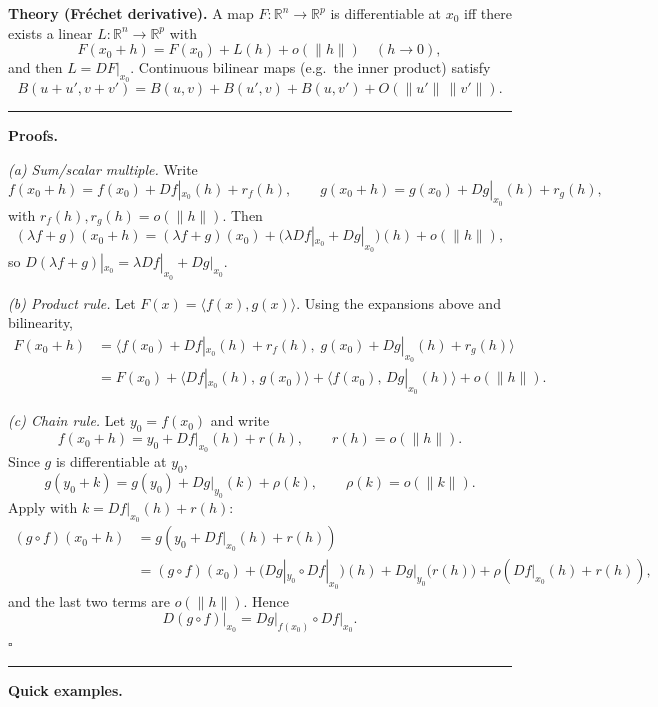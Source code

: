 \documentclass[12pt,a4paper]{article}
\theoremstyle{plain}
\theoremstyle{definition}
\theoremstyle{remark}
\theoremstyle{remark}
\newcommand{\sep}{\vspace{6pt}\hrule\vspace{8pt}}
\begin{document}
\textbf{Theory (Fréchet derivative).}
A map \(F:\mathbb{R}^n\to\mathbb{R}^p\) is differentiable at \(x_0\) iff there exists a
linear \(L:\mathbb{R}^n\to\mathbb{R}^p\) with
\[
F(x_0+h) = F(x_0) + L(h) + o(\|h\|) \quad (h\to 0),
\]
and then \(L = DF|_{x_0}\).
Continuous bilinear maps (e.g.\ the inner product) satisfy
\[
B(u+u',v+v') = B(u,v)+B(u',v)+B(u,v')+O(\|u'\|\,\|v'\|).
\]

\sep

\textbf{Proofs.}

\textit{(a) Sum/scalar multiple.}
Write
\[
f(x_0+h)=f(x_0)+Df|_{x_0}(h)+r_f(h),\qquad
g(x_0+h)=g(x_0)+Dg|_{x_0}(h)+r_g(h),
\]
with \(r_f(h),r_g(h)=o(\|h\|)\).
Then
\[
(\lambda f+g)(x_0+h)
= (\lambda f+g)(x_0)
+ \big(\lambda Df|_{x_0}+Dg|_{x_0}\big)(h)
+ o(\|h\|),
\]
so \(D(\lambda f+g)|_{x_0}=\lambda Df|_{x_0}+Dg|_{x_0}\).

\medskip

\textit{(b) Product rule.}
Let \(F(x)=\langle f(x),g(x)\rangle\).
Using the expansions above and bilinearity,
\[
\begin{aligned}
	F(x_0+h)
	&= \big\langle f(x_0)+Df|_{x_0}(h)+r_f(h),\;
	g(x_0)+Dg|_{x_0}(h)+r_g(h) \big\rangle \\[4pt]
	&= F(x_0)
	+ \langle Df|_{x_0}(h),\, g(x_0)\rangle
	+ \langle f(x_0),\, Dg|_{x_0}(h)\rangle
	+ o(\|h\|).
\end{aligned}
\]

\medskip

\textit{(c) Chain rule.}
Let \(y_0=f(x_0)\) and write
\[
f(x_0+h) = y_0 + Df|_{x_0}(h) + r(h),\qquad r(h)=o(\|h\|).
\]
Since \(g\) is differentiable at \(y_0\),
\[
g(y_0+k) = g(y_0) + Dg|_{y_0}(k) + \rho(k),\qquad \rho(k)=o(\|k\|).
\]
Apply with \(k = Df|_{x_0}(h)+r(h)\):
\[
\begin{aligned}
	(g\circ f)(x_0+h)
	&= g\!\left(y_0 + Df|_{x_0}(h) + r(h)\right) \\[2pt]
	&= (g\circ f)(x_0)
	+ \big(Dg|_{y_0}\circ Df|_{x_0}\big)(h)
	+ Dg|_{y_0}\big(r(h)\big)
	+ \rho\!\left(Df|_{x_0}(h)+r(h)\right),
\end{aligned}
\]
and the last two terms are \(o(\|h\|)\). Hence
\[
D(g\circ f)\big|_{x_0} = Dg\big|_{f(x_0)} \circ Df\big|_{x_0}.
\]
\hfill$\square$

	
	\sep
	
	\textbf{Quick examples.}
	
\end{document}
